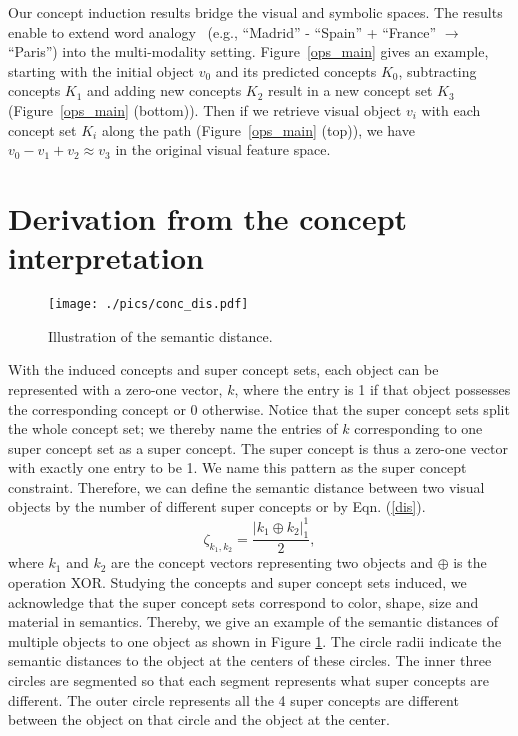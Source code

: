\documentclass[10pt,twocolumn,letterpaper]{article}
\begin{document}
Our concept induction results bridge the visual and symbolic spaces. The results enable to extend word analogy~\cite{mikolov2013distributed} (e.g., ``Madrid'' - ``Spain'' + ``France'' $\rightarrow$ ``Paris'') into the multi-modality setting.
Figure~\ref{ops_main} gives an example, starting with the initial object $v_0$ and its predicted concepts $K_0$, subtracting concepts $K_1$ and adding new concepts $K_2$ result in a new concept set $K_3$ (Figure~\ref{ops_main} (bottom)). Then if we retrieve visual object $v_i$ with each concept set $K_i$ along the path (Figure~\ref{ops_main} (top)), we have $v_0 - v_1 + v_2 \approx v_3$ in the original visual feature space.

\section{Derivation from the concept interpretation}
\label{app:concept_dis}

\label{app:visualization}
\begin{figure}[h]
\centering
\texttt{[image: ./pics/conc\_dis.pdf]}
\caption{Illustration of the semantic distance.}
\label{conc_dis}
\end{figure}

With the induced concepts and super concept sets, each object can be represented with a zero-one vector, $k$, where the entry is 1 if that object possesses the corresponding concept or 0 otherwise. Notice that the super concept sets split the whole concept set; we thereby name the entries of $k$ corresponding to one super concept set as a super concept. The super concept is thus a zero-one vector with exactly one entry to be 1. We name this pattern as the super concept constraint. Therefore, we can define the semantic distance between two visual objects by the number of different super concepts or by Eqn. (\ref{dis}). 
\begin{equation}
    \zeta_{k_1, k_2} = \frac{|k_1 \oplus k_2|^1_1}{2},
    \label{dis}
\end{equation}
where $k_1$ and $k_2$ are the concept vectors representing two objects and $\oplus$ is the operation XOR. Studying the concepts and super concept sets induced, we acknowledge that the super concept sets correspond to color, shape, size and material in semantics. Thereby, we give an example of the semantic distances of multiple objects to one object as shown in Figure \ref{conc_dis}. The circle radii indicate the semantic distances to the object at the centers of these circles. The inner three circles are segmented so that each segment represents what super concepts are different. The outer circle represents all the 4 super concepts are different between the object on that circle and the object at the center.
\end{document}

